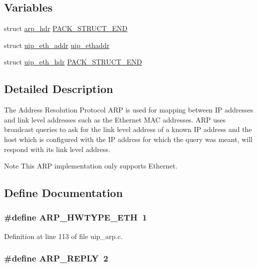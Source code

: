 \subsection*{Variables}
\begin{DoxyCompactItemize}
\item 
struct \hyperlink{structarp__hdr}{arp\_\-hdr} \hyperlink{group__uiparp_ga61953c615dbf189b18855737b02471ff}{PACK\_\-STRUCT\_\-END}
\item 
struct \hyperlink{structuip__eth__addr}{uip\_\-eth\_\-addr} \hyperlink{group__uiparp_ga499bb98a0b4ae9a98553ede81317606d}{uip\_\-ethaddr}
\item 
struct \hyperlink{structuip__eth__hdr}{uip\_\-eth\_\-hdr} \hyperlink{group__uiparp_ga1c9b41c7403c38cd943ecf0a91543119}{PACK\_\-STRUCT\_\-END}
\end{DoxyCompactItemize}


\subsection{Detailed Description}
The Address Resolution Protocol ARP is used for mapping between IP addresses and link level addresses such as the Ethernet MAC addresses. ARP uses broadcast queries to ask for the link level address of a known IP address and the host which is configured with the IP address for which the query was meant, will respond with its link level address.

\begin{DoxyNote}{Note}
This ARP implementation only supports Ethernet. 
\end{DoxyNote}


\subsection{Define Documentation}
\hypertarget{group__uiparp_gabb56b549f7ab4d86e1cc39b8afc70d1e}{
\subsubsection[{ARP\_\-HWTYPE\_\-ETH}]{\setlength{\rightskip}{0pt plus 5cm}\#define ARP\_\-HWTYPE\_\-ETH~1}}
\label{group__uiparp_gabb56b549f7ab4d86e1cc39b8afc70d1e}


Definition at line 113 of file uip\_\-arp.c.

\hypertarget{group__uiparp_ga06ba7b414e718081998f2814090debf1}{
\subsubsection[{ARP\_\-REPLY}]{\setlength{\rightskip}{0pt plus 5cm}\#define ARP\_\-REPLY~2}}
\label{group__uiparp_ga06ba7b414e718081998f2814090debf1}


